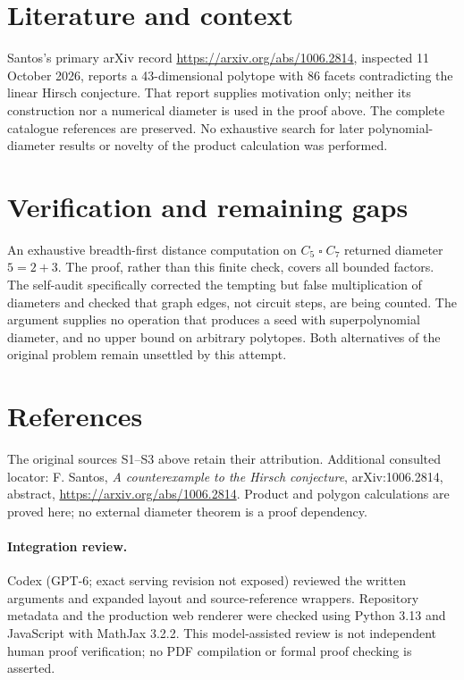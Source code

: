 \documentclass[11pt]{article}
\begin{document}
\section{Literature and context}
Santos's primary arXiv record \url{https://arxiv.org/abs/1006.2814}, inspected 11 October 2026, reports a 43-dimensional polytope with 86 facets contradicting the linear Hirsch conjecture. That report supplies motivation only; neither its construction nor a numerical diameter is used in the proof above. The complete catalogue references are preserved. No exhaustive search for later polynomial-diameter results or novelty of the product calculation was performed.

\section{Verification and remaining gaps}
An exhaustive breadth-first distance computation on $C_5\mathbin\square C_7$ returned diameter $5=2+3$. The proof, rather than this finite check, covers all bounded factors. The self-audit specifically corrected the tempting but false multiplication of diameters and checked that graph edges, not circuit steps, are being counted. The argument supplies no operation that produces a seed with superpolynomial diameter, and no upper bound on arbitrary polytopes. Both alternatives of the original problem remain unsettled by this attempt.

\section{References}
The original sources S1--S3 above retain their attribution. Additional consulted locator: F. Santos, \emph{A counterexample to the Hirsch conjecture}, arXiv:1006.2814, abstract, \url{https://arxiv.org/abs/1006.2814}. Product and polygon calculations are proved here; no external diameter theorem is a proof dependency.


\paragraph{Integration review.} Codex (GPT-6; exact serving revision not exposed) reviewed the written arguments and expanded layout and source-reference wrappers. Repository metadata and the production web renderer were checked using Python 3.13 and JavaScript with MathJax 3.2.2. This model-assisted review is not independent human proof verification; no PDF compilation or formal proof checking is asserted.
\end{document}
